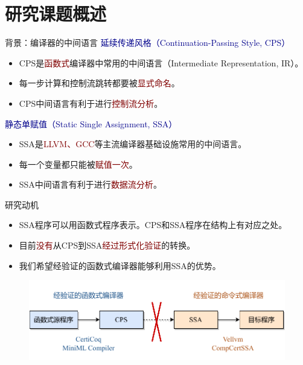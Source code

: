
\section{研究课题概述}

\begin{frame}{背景：编译器的中间语言}
  \textcolor{DarkBlue}{延续传递风格（Continuation-Passing Style, CPS）}
  \begin{itemize}
    \item CPS是\textcolor{Maroon}{函数式}编译器中常用的中间语言（Intermediate Representation, IR）。
    \item 每一步计算和控制流跳转都要被\textcolor{Maroon}{显式命名}。
    \item CPS中间语言有利于进行\textcolor{Maroon}{控制流分析}。
  \end{itemize}
  \vspace{2ex}
  \textcolor{DarkBlue}{静态单赋值（Static Single Assignment, SSA）}
  \begin{itemize}
    \item SSA是\textcolor{Maroon}{LLVM、GCC}等主流编译器基础设施常用的中间语言。
    \item 每一个变量都只能被\textcolor{Maroon}{赋值一次}。
    \item SSA中间语言有利于进行\textcolor{Maroon}{数据流分析}。
  \end{itemize}
\end{frame}

\begin{frame}{研究动机}
    \begin{itemize}
      \item SSA程序可以用函数式程序表示。CPS和SSA程序在结构上有对应之处。
      \item 目前\textcolor{Maroon}{没有}从CPS到SSA\textcolor{Maroon}{经过形式化验证}的转换。
      \item 我们希望经验证的函数式编译器能够利用SSA的优势。
    \end{itemize} 
    \begin{figure}
      \centering
      \includegraphics[width=0.8\linewidth]{figures/motiva.pdf}
      \label{fig:moti1}
    \end{figure}
\end{frame}


